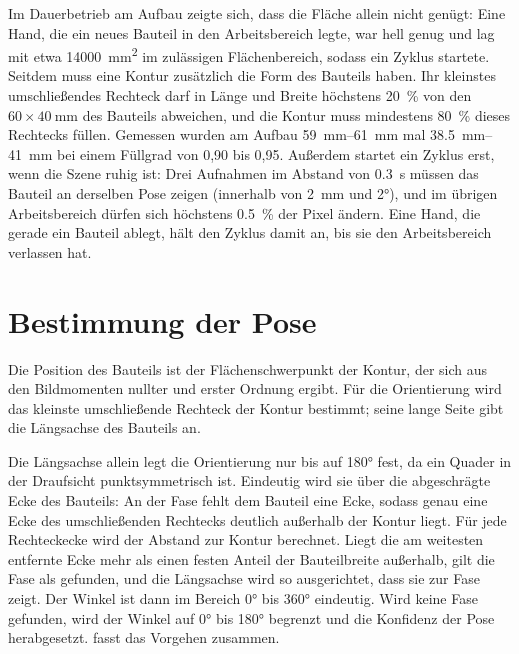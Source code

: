 Im Dauerbetrieb am Aufbau zeigte sich, dass die Fläche allein nicht genügt: Eine Hand, die ein
neues Bauteil in den Arbeitsbereich legte, war hell genug und lag mit etwa
\SI{14000}{\milli\metre\squared} im zulässigen Flächenbereich, sodass ein Zyklus startete. Seitdem
muss eine Kontur zusätzlich die Form des Bauteils haben. Ihr kleinstes umschließendes Rechteck
darf in Länge und Breite höchstens \SI{20}{\percent} von den $60 \times \SI{40}{\milli\metre}$ des
Bauteils abweichen, und die Kontur muss mindestens \SI{80}{\percent} dieses Rechtecks füllen.
Gemessen wurden am Aufbau \SIrange{59}{61}{\milli\metre} mal \SIrange{38,5}{41}{\milli\metre}
bei einem Füllgrad von 0,90 bis 0,95. Außerdem startet ein Zyklus erst, wenn die Szene ruhig
ist: Drei Aufnahmen im Abstand von \SI{0,3}{\second} müssen das Bauteil an derselben Pose zeigen
(innerhalb von \SI{2}{\milli\metre} und \ang{2}), und im übrigen Arbeitsbereich dürfen sich
höchstens \SI{0,5}{\percent} der Pixel ändern. Eine Hand, die gerade ein Bauteil ablegt, hält den
Zyklus damit an, bis sie den Arbeitsbereich verlassen hat.

\section{Bestimmung der Pose}
\label{sec:m1-pose}

Die Position des Bauteils ist der Flächenschwerpunkt der Kontur, der sich aus den
Bildmomenten nullter und erster Ordnung ergibt. Für die Orientierung wird das kleinste
umschließende Rechteck der Kontur bestimmt; seine lange Seite gibt die Längsachse des
Bauteils an.

Die Längsachse allein legt die Orientierung nur bis auf \ang{180} fest, da ein Quader in der
Draufsicht punktsymmetrisch ist. Eindeutig wird sie über die abgeschrägte Ecke des Bauteils:
An der Fase fehlt dem Bauteil eine Ecke, sodass genau eine Ecke des umschließenden Rechtecks
deutlich außerhalb der Kontur liegt. Für jede Rechteckecke wird der Abstand zur Kontur
berechnet. Liegt die am weitesten entfernte Ecke mehr als einen festen Anteil der
Bauteilbreite außerhalb, gilt die Fase als gefunden, und die Längsachse wird so ausgerichtet,
dass sie zur Fase zeigt. Der Winkel ist dann im Bereich \ang{0} bis \ang{360} eindeutig. Wird
keine Fase gefunden, wird der Winkel auf \ang{0} bis \ang{180} begrenzt und die Konfidenz der
Pose herabgesetzt.  fasst das Vorgehen zusammen.

